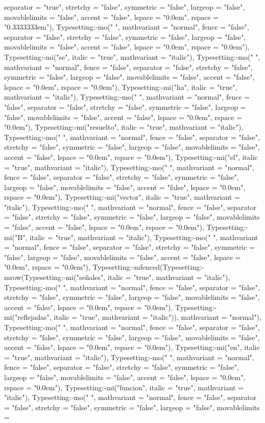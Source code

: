 \documentclass{article}
\begin{document}
\begin{Maple Normal}
{\begin{Maple Normal}
{separator = "true", stretchy = "false", symmetric = "false", largeop = "false", movablelimits = "false", accent = "false", lspace = "0.0em", rspace = "0.3333333em"), Typesetting:-mo(" ", mathvariant = "normal", fence = "false", separator = "false", stretchy = "false", symmetric = "false", largeop = "false", movablelimits = "false", accent = "false", lspace = "0.0em", rspace = "0.0em"), Typesetting:-mi("se", italic = "true", mathvariant = "italic"), Typesetting:-mo(" ", mathvariant = "normal", fence = "false", separator = "false", stretchy = "false", symmetric = "false", largeop = "false", movablelimits = "false", accent = "false", lspace = "0.0em", rspace = "0.0em"), Typesetting:-mi("ha", italic = "true", mathvariant = "italic"), Typesetting:-mo(" ", mathvariant = "normal", fence = "false", separator = "false", stretchy = "false", symmetric = "false", largeop = "false", movablelimits = "false", accent = "false", lspace = "0.0em", rspace = "0.0em"), Typesetting:-mi("resuelto", italic = "true", mathvariant = "italic"), Typesetting:-mo(" ", mathvariant = "normal", fence = "false", separator = "false", stretchy = "false", symmetric = "false", largeop = "false", movablelimits = "false", accent = "false", lspace = "0.0em", rspace = "0.0em"), Typesetting:-mi("el", italic = "true", mathvariant = "italic"), Typesetting:-mo(" ", mathvariant = "normal", fence = "false", separator = "false", stretchy = "false", symmetric = "false", largeop = "false", movablelimits = "false", accent = "false", lspace = "0.0em", rspace = "0.0em"), Typesetting:-mi("vector", italic = "true", mathvariant = "italic"), Typesetting:-mo(" ", mathvariant = "normal", fence = "false", separator = "false", stretchy = "false", symmetric = "false", largeop = "false", movablelimits = "false", accent = "false", lspace = "0.0em", rspace = "0.0em"), Typesetting:-mi("B", italic = "true", mathvariant = "italic"), Typesetting:-mo(" ", mathvariant = "normal", fence = "false", separator = "false", stretchy = "false", symmetric = "false", largeop = "false", movablelimits = "false", accent = "false", lspace = "0.0em", rspace = "0.0em"), Typesetting:-mfenced(Typesetting:-mrow(Typesetting:-mi("señales", italic = "true", mathvariant = "italic"), Typesetting:-mo(" ", mathvariant = "normal", fence = "false", separator = "false", stretchy = "false", symmetric = "false", largeop = "false", movablelimits = "false", accent = "false", lspace = "0.0em", rspace = "0.0em"), Typesetting:-mi("reflejadas", italic = "true", mathvariant = "italic")), mathvariant = "normal"), Typesetting:-mo(" ", mathvariant = "normal", fence = "false", separator = "false", stretchy = "false", symmetric = "false", largeop = "false", movablelimits = "false", accent = "false", lspace = "0.0em", rspace = "0.0em"), Typesetting:-mi("en", italic = "true", mathvariant = "italic"), Typesetting:-mo(" ", mathvariant = "normal", fence = "false", separator = "false", stretchy = "false", symmetric = "false", largeop = "false", movablelimits = "false", accent = "false", lspace = "0.0em", rspace = "0.0em"), Typesetting:-mi("funcion", italic = "true", mathvariant = "italic"), Typesetting:-mo(" ", mathvariant = "normal", fence = "false", separator = "false", stretchy = "false", symmetric = "false", largeop = "false", movablelimits = }
\end{Maple Normal}}
\end{Maple Normal}
\end{document}
